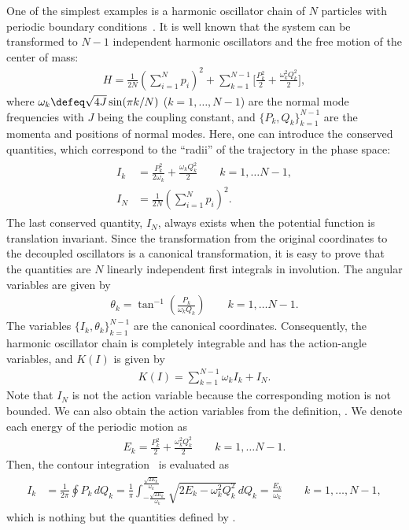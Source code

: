 One of the simplest examples is a harmonic oscillator chain of $N$ particles with periodic boundary conditions~\cite{Arnold-text}.
It is well known that the system can be transformed to $N-1$ independent harmonic oscillators and the free motion of the center of mass:
\begin{align}
 H = \frac{1}{2N}\left(\sum_{i=1}^N p_i\right)^2 + \sum_{k=1}^{N-1} \Big[ \frac{P_k^2}{2} + \frac{\omega_k^2 Q_k^2}{2} \Big],
\end{align}
where $\omega_k \defeq \sqrt{4J}\sin (\pi k/N)$ ($k=1,\ldots,N-1$) are the normal mode frequencies with $J$ being the coupling constant, and $\{P_k,Q_k\}_{k=1}^{N-1}$ are the momenta and positions of normal modes.
Here, one can introduce the conserved quantities, which correspond to the ``radii'' of the trajectory in the phase space:
\begin{align}
 \begin{split}
   I_k & = \frac{P_k^2}{2\omega_k} + \frac{\omega_k Q_k^2}{2} \qquad k = 1, \ldots N-1,\\
   I_N & = \frac{1}{2N}\left(\sum_{i=1}^N p_i\right)^2.
 \end{split}\label{eq:harmonic_oscillator_canonical_trans}
\end{align}
The last conserved quantity, $I_N$, always exists when the potential function is translation invariant.
Since the transformation from the original coordinates to the decoupled oscillators is a canonical transformation, it is easy to prove that the quantities are $N$ linearly independent first integrals in involution.
The angular variables are given by
\begin{align}
 \theta_k = \tan^{-1}\left(\frac{P_k}{\omega_k Q_k}\right) \qquad k = 1, \ldots N-1.
\end{align}
The variables $\{I_k,\theta_k\}_{k=1}^{N-1}$ are the canonical coordinates.
Consequently, the harmonic oscillator chain is completely integrable and has the action-angle variables, and $K(I)$ is given by
\begin{align}
  K(I) = \sum_{k=1}^{N-1}\omega_k I_k + I_N \label{eq:harmonic_oscillator_K_I}.
\end{align}
Note that $I_N$ is not the action variable because the corresponding motion is not bounded.
We can also obtain the action variables from the definition, .
We denote each energy of the periodic motion as
\begin{align}
  E_k = \frac{P_k^2}{2} + \frac{\omega_k^2 Q_k^2}{2} \qquad k = 1, \ldots N-1.
\end{align}
Then, the contour integration~ is evaluated as
\begin{align}
  \begin{split}
    I_k & = \frac{1}{2\pi}\oint P_k \, dQ_k
        = \frac{1}{\pi} \int_{-\frac{\sqrt{2E_k}}{\omega_k}}^{\frac{\sqrt{2E_k}}{\omega_k}} \sqrt{2E_k -\omega_k^2Q_k^2} \, dQ_k
        = \frac{E_k}{\omega_k} \qquad k=1,\ldots,N-1,
  \end{split} \label{eq:action_of_harmonic_derived_from_circle_integration}
\end{align}
which is nothing but the quantities defined by .

